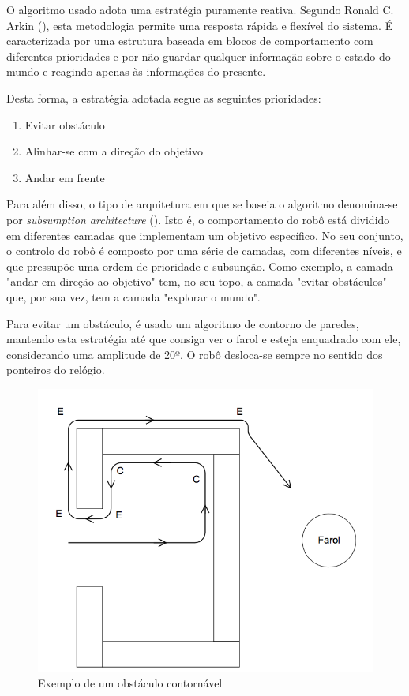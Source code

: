 \documentclass[citeauthoryear]{llncs} %
\begin{document}
O algoritmo usado adota uma estratégia puramente reativa. Segundo Ronald C. Arkin (\cite{arkin}), esta metodologia permite uma resposta rápida e flexível do sistema. É caracterizada por uma estrutura baseada em blocos de comportamento com diferentes prioridades e por não guardar qualquer informação sobre o estado do mundo e reagindo apenas às informações do presente. 

Desta forma, a estratégia adotada segue as seguintes prioridades:

\begin{enumerate}
\item Evitar obstáculo
\item Alinhar-se com a direção do objetivo
\item Andar em frente
\end{enumerate}

Para além disso, o tipo de arquitetura em que se baseia o algoritmo denomina-se por \emph{subsumption architecture} (\cite{brooks}). Isto é, o comportamento do robô está dividido em diferentes camadas que implementam um objetivo específico. No seu conjunto, o controlo do robô é composto por uma série de camadas, com diferentes níveis, e que pressupõe uma ordem de prioridade e subsunção.  Como exemplo, a camada "andar em direção ao objetivo" tem, no seu topo, a camada "evitar obstáculos" que, por sua vez, tem a camada "explorar o mundo".

Para evitar um obstáculo, é usado um algoritmo de contorno de paredes, mantendo esta estratégia até que consiga ver o farol e esteja enquadrado com ele, considerando uma amplitude de 20º. O robô desloca-se sempre no sentido dos ponteiros do relógio.   

\begin{figure}[]
\begin{center}
\includegraphics[scale=0.30]{fig1.png}
\caption{Exemplo de um obstáculo contornável}
\vspace{-20pt}
\end{center}
\end{figure}
\end{document}
